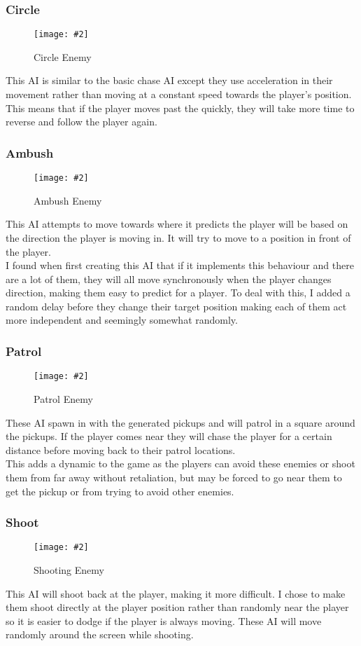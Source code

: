 \documentclass{article}
\newcommand{\n}[0]{\\[\baselineskip]}
\newcommand{\figimg}[3]{
  \begin{figure}[H]
    \centering
    \texttt{[image: \#2]}
    \caption{#3}
  \end{figure}
  \noindent 
}
\begin{document}
\subsubsection{Circle}
\figimg{0.1}{imgs/CircleEnemy.png}{Circle Enemy}
This AI is similar to the basic chase AI except they use acceleration in their movement rather than moving at a constant speed towards the player's position. This means that if the player moves past the quickly, they will take more time to reverse and follow the player again. 

\subsubsection{Ambush}
\figimg{0.1}{imgs/AmbushEnemy.png}{Ambush Enemy}
This AI attempts to move towards where it predicts the player will be based on the direction the player is moving in. It will try to move to a position in front of the player. 
\n
I found when first creating this AI that if it implements this behaviour and there are a lot of them, they will all move synchronously when the player changes direction, making them easy to predict for a player. To deal with this, I added a random delay before they change their target position making each of them act more independent and seemingly somewhat randomly.

\subsubsection{Patrol}
\figimg{0.1}{imgs/PatrolEnemy.png}{Patrol Enemy}
These AI spawn in with the generated pickups and will patrol in a square around the pickups. If the player comes near they will chase the player for a certain distance before moving back to their patrol locations.
\n
This adds a dynamic to the game as the players can avoid these enemies or shoot them from far away without retaliation, but may be forced to go near them to get the pickup or from trying to avoid other enemies.

\subsubsection{Shoot}
\figimg{0.1}{imgs/ShootEnemy.png}{Shooting Enemy}
This AI will shoot back at the player, making it more difficult. I chose to make them shoot directly at the player position rather than randomly near the player so it is easier to dodge if the player is always moving. These AI will move randomly around the screen while shooting.
\end{document}
